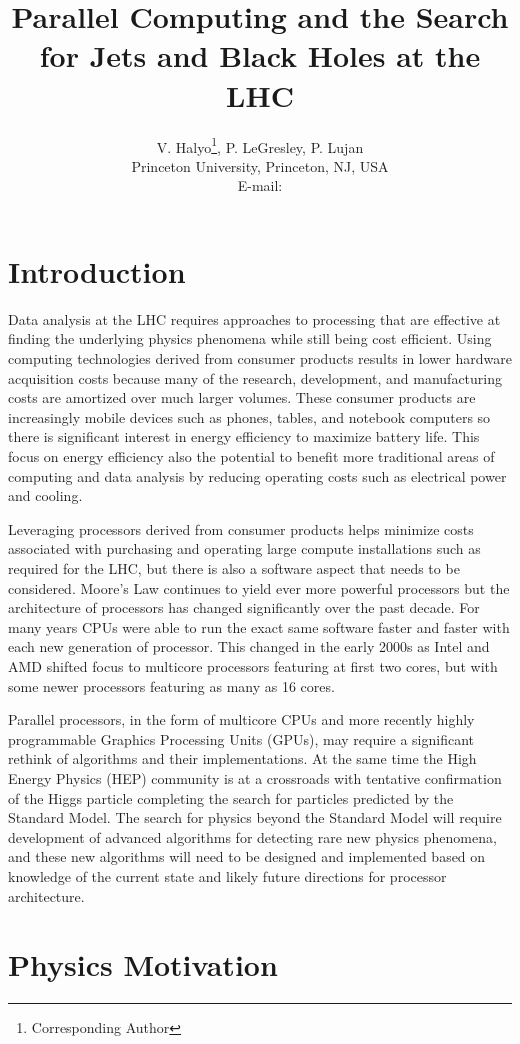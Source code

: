 \documentclass{JINST}
\title{Parallel Computing and the Search for Jets and Black Holes at the LHC}
\author{V. Halyo\thanks{Corresponding Author}, P. LeGresley, P. Lujan \\
\llap Princeton University, Princeton, NJ, USA \\
E-mail: \email{vhalyo@gmail.com}}
\begin{document}
\section{Introduction} 

Data analysis at the LHC requires approaches to processing that are effective at finding the underlying physics phenomena while still being cost efficient.  Using computing technologies derived from consumer products results in lower hardware acquisition costs because many of the research, development, and manufacturing costs are amortized over much larger volumes.  These consumer products are increasingly mobile devices such as phones, tables, and notebook computers so there is significant interest in energy efficiency to maximize battery life.  This focus on energy efficiency also the potential to benefit more traditional areas of computing and data analysis by reducing operating costs such as electrical power and cooling.

Leveraging processors derived from consumer products helps minimize costs associated with purchasing and operating large compute installations such as required for the LHC, but there is also a software aspect that needs to be considered.  Moore's Law continues to yield ever more powerful processors but the architecture of processors has changed significantly over the past decade.  For many years CPUs were able to run the exact same software faster and faster with each new generation of processor.  This changed in the early 2000s as Intel and AMD shifted focus to multicore processors featuring at first two cores, but with some newer processors featuring as many as 16 cores.

Parallel processors, in the form of multicore CPUs and more recently highly programmable Graphics Processing Units (GPUs), may require a significant rethink of algorithms and their implementations.  At the same time the High Energy Physics (HEP) community is at a crossroads with tentative confirmation of the Higgs particle completing the search for particles predicted by the Standard Model.  The search for physics beyond the Standard Model will require development of advanced algorithms for detecting rare new physics phenomena, and these new algorithms will need to be designed and implemented based on knowledge of the current state and likely future directions for processor architecture.

\section{Physics Motivation}
\end{document}
